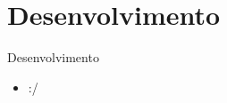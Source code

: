 \section{Desenvolvimento}\label{sec:desenvolvimento}
\begin{frame}[allowframebreaks]{Desenvolvimento}
	\begin{itemize}
		\setlength{\itemsep}{0.5em}
		\item :/
	\end{itemize}
\end{frame}